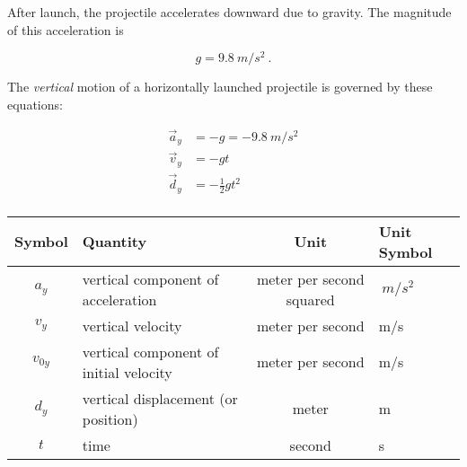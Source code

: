 \documentclass{article}
\begin{document}
\begin{mdframed}[backgroundcolor=black!10]
After launch, the projectile accelerates downward due to gravity. The magnitude of this acceleration is

\begin{equation*}
    g = \SI{9.8}{m/s^2}\ .
\end{equation*}
\end{mdframed}

\begin{mdframed}[backgroundcolor=black!10]
The \textit{vertical} motion of a horizontally launched projectile is governed by these equations:
\vspace{-1em}

\begin{align*}
    \vec{a}_y &= -g = -\SI{9.8}{m/s^2}\\
    \vec{v}_y &= - gt\\
    \vec{d}_y &= -\frac{1}{2} g t^2\\
\end{align*}
\vspace{-3em}

\begin{center}
    \begin{tabular}{cl|cl}
    \hline
    \textbf{Symbol} & \textbf{Quantity} & \textbf{Unit} & \textbf{Unit Symbol}  \\
    \hline\hline
        $a_y$ & vertical component of acceleration & meter per second squared & $\SI{}{m/s^2}$\\
        $v_y$ & vertical velocity & meter per second & m/s\\
        $v_{0y}$ & vertical component of initial velocity & meter per second & m/s\\
        $d_y$ & vertical displacement (or position) & meter & m\\
        $t$ & time & second & s\\
    \hline
    \end{tabular}
\end{center}
\end{mdframed}




\end{document}
